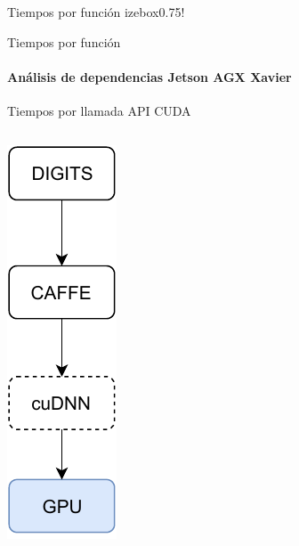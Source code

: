 \begin{frame}{Tiempos por función}
izebox{0.75\linewidth}{!}{

}
\end{frame}


\begin{frame}{Tiempos por función}
\framesubtitle{Análisis de dependencias Jetson AGX Xavier}
\centering
\resizebox{0.75\linewidth}{!}{

}
\end{frame}



\begin{frame}{Tiempos por llamada API CUDA}
	\begin{columns}
 \includegraphics[width=1\textwidth]{diagrama/frame4.pdf}
        

\end{columns}
\end{frame}
